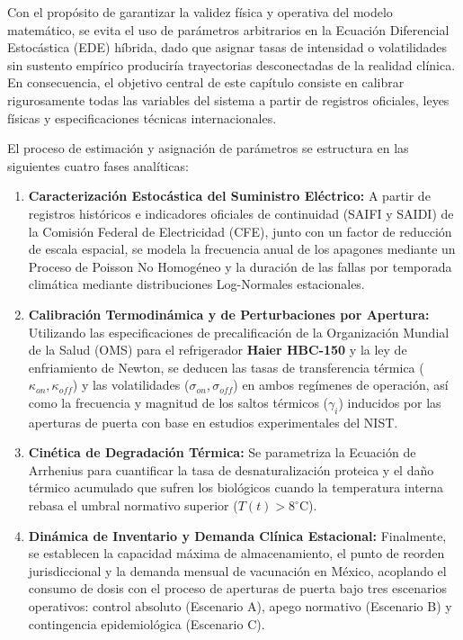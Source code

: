 \documentclass[
  spanish,
  us-letterpaper,
]{scrreprt}
\providecommand{\tightlist}{%
  \setlength{\itemsep}{0pt}\setlength{\parskip}{0pt}}
\numberwithin{equation}{section}
\theoremstyle{plain}
\theoremstyle{plain}
\theoremstyle{definition}
\theoremstyle{plain}
\theoremstyle{remark}
\begin{document}
Con el propósito de garantizar la validez física y operativa del modelo
matemático, se evita el uso de parámetros arbitrarios en la Ecuación
Diferencial Estocástica (EDE) híbrida, dado que asignar tasas de
intensidad o volatilidades sin sustento empírico produciría trayectorias
desconectadas de la realidad clínica. En consecuencia, el objetivo
central de este capítulo consiste en calibrar rigurosamente todas las
variables del sistema a partir de registros oficiales, leyes físicas y
especificaciones técnicas internacionales.

El proceso de estimación y asignación de parámetros se estructura en las
siguientes cuatro fases analíticas:

\begin{enumerate}
\def\labelenumi{\arabic{enumi}.}
\tightlist
\item
  \textbf{Caracterización Estocástica del Suministro Eléctrico:} A
  partir de registros históricos e indicadores oficiales de continuidad
  (SAIFI y SAIDI) de la Comisión Federal de Electricidad (CFE), junto
  con un factor de reducción de escala espacial, se modela la frecuencia
  anual de los apagones mediante un Proceso de Poisson No Homogéneo y la
  duración de las fallas por temporada climática mediante distribuciones
  Log-Normales estacionales.
\item
  \textbf{Calibración Termodinámica y de Perturbaciones por Apertura:}
  Utilizando las especificaciones de precalificación de la Organización
  Mundial de la Salud (OMS) para el refrigerador \textbf{Haier HBC-150}
  y la ley de enfriamiento de Newton, se deducen las tasas de
  transferencia térmica (\(\kappa_{on}, \kappa_{off}\)) y las
  volatilidades (\(\sigma_{on}, \sigma_{off}\)) en ambos regímenes de
  operación, así como la frecuencia y magnitud de los saltos térmicos
  (\(\gamma_i\)) inducidos por las aperturas de puerta con base en
  estudios experimentales del NIST.
\item
  \textbf{Cinética de Degradación Térmica:} Se parametriza la Ecuación
  de Arrhenius para cuantificar la tasa de desnaturalización proteica y
  el daño térmico acumulado que sufren los biológicos cuando la
  temperatura interna rebasa el umbral normativo superior
  (\(T(t) > 8^\circ\text{C}\)).
\item
  \textbf{Dinámica de Inventario y Demanda Clínica Estacional:}
  Finalmente, se establecen la capacidad máxima de almacenamiento, el
  punto de reorden jurisdiccional y la demanda mensual de vacunación en
  México, acoplando el consumo de dosis con el proceso de aperturas de
  puerta bajo tres escenarios operativos: control absoluto (Escenario
  A), apego normativo (Escenario B) y contingencia epidemiológica
  (Escenario C).
\end{enumerate}
\end{document}
